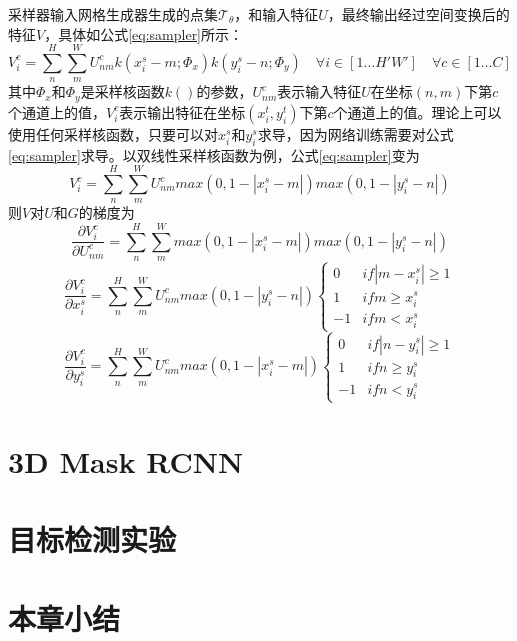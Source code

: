 采样器输入网格生成器生成的点集$\mathcal{T}_\theta$，和输入特征$U$，最终输出经过空间变换后的特征$V$，具体如公式\ref{eq:sampler}所示：
\begin{equation}
  \label{eq:sampler}
  V_i^c = \sum_n^H\sum_m^W{U_{nm}^ck(x_i^s-m;\Phi_x)k(y_i^s-n;\Phi_y)}\quad \forall i\in[1\ldots H'W']\quad \forall c\in[1\ldots C]
\end{equation}
其中$\Phi_{x}$和$\Phi_{y}$是采样核函数$k()$的参数，$U_{nm}^c$表示输入特征$U$在坐标$(n, m)$下第$c$个通道上的值，$V_i^c$表示输出特征在坐标$(x_i^t,y_i^t)$下第$c$个通道上的值。理论上可以使用任何采样核函数，只要可以对$x_i^s$和$y_i^s$求导，因为网络训练需要对公式\ref{eq:sampler}求导。以双线性采样核函数为例，公式\ref{eq:sampler}变为
\begin{equation}
  V_i^c = \sum_n^H\sum_m^W{U_{nm}^cmax(0, 1-|x_i^s-m|)max(0, 1-|y_i^s-n|)}
\end{equation}
则$V$对$U$和$G$的梯度为
\begin{equation}
  \frac{\partial V_i^c}{\partial U_{nm}^c} = \sum_n^H\sum_m^W{max(0, 1-|x_i^s-m|)max(0, 1-|y_i^s-n|)}
\end{equation}
\begin{equation}
  \frac{\partial V_i^c}{\partial x_i^s} = \sum_n^H\sum_m^W{U_{nm}^cmax(0, 1-|y_i^s-n|)}
  \left\{
      \begin{array}{ll}
        0&if|m-x_i^s| \geq 1\\
        1&if m \geq x_i^s\\
        -1&if m < x_i^s
      \end{array}
    \right.
\end{equation}
\begin{equation}
  \frac{\partial V_i^c}{\partial y_i^s} = \sum_n^H\sum_m^W{U_{nm}^cmax(0, 1-|x_i^s-m|)}
  \left\{
      \begin{array}{ll}
        0&if|n-y_i^s| \geq 1\\
        1&if n \geq y_i^s\\
        -1&if n < y_i^s
      \end{array}
    \right.
\end{equation}


\section{3D Mask RCNN}

\section{目标检测实验}

\section{本章小结}


